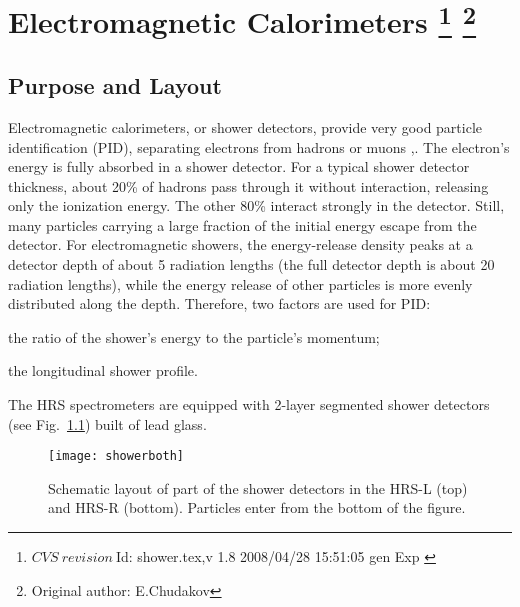 \chapter[Electromagnetic Calorimeters]{Electromagnetic Calorimeters
\footnote{
  $CVS~revision~ $Id: shower.tex,v 1.8 2008/04/28 15:51:05 gen Exp $ $
}
\footnote{Original author: E.Chudakov }
}

\section{Purpose and Layout}

Electromagnetic calorimeters, or shower detectors, provide very good
particle identification (PID), separating electrons from hadrons or
muons \cite{Bartoszek:1991ex},\cite{Appel:1975tt}.  The electron's energy
is fully absorbed in a shower detector.  For a typical shower detector
thickness, about 20\% of hadrons pass through it without interaction,
releasing only the ionization energy.  The other 80\% interact
strongly in the detector. Still, many particles carrying a large
fraction of the initial energy escape from the detector. For
electromagnetic showers, the energy-release density peaks at a
detector depth of about 5 radiation lengths (the full detector depth
is about 20 radiation lengths), while the energy release of other
particles is more evenly distributed along the depth.  Therefore, two
factors are used for PID:
\begin{list}{.~}{\setlength{\itemsep}{-0.15cm}}
  \item the ratio of the shower's energy to the particle's momentum;
  \item the longitudinal shower profile.
\end{list}

The HRS spectrometers are equipped with 2-layer segmented shower
detectors (see Fig.~\ref{fig:hrs-det-shower_layout}) built of
lead glass.
\begin{figure}[htb]
\begin{center}
   \texttt{[image: showerboth]}
\end{center}
\caption[Schematic layout of part of the shower detectors in the HRS]%
{Schematic layout of part of the shower detectors in the HRS-L
(top) and HRS-R (bottom). Particles enter from the bottom of the figure.}
\label{fig:hrs-det-shower_layout}
\end{figure}
  
